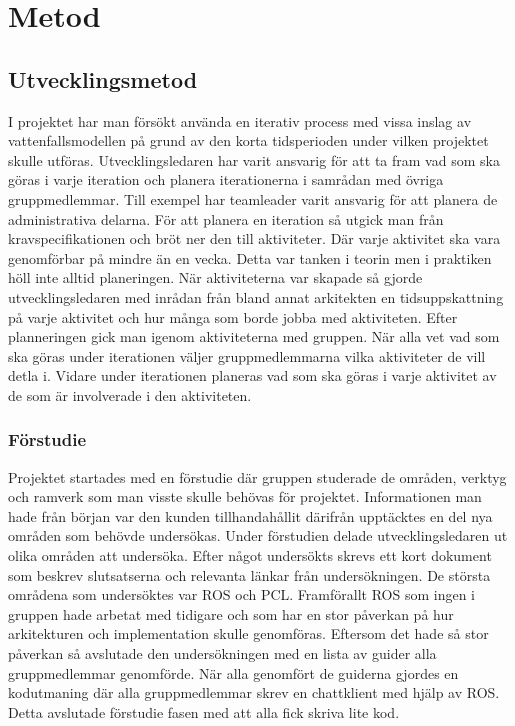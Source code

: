 \chapter{Metod}
\label{cha:method}

\section{Utvecklingsmetod}

I projektet har man försökt använda en iterativ process med vissa inslag av vattenfallsmodellen på grund av den korta tidsperioden under vilken projektet skulle utföras. Utvecklingsledaren har varit ansvarig för att ta fram vad som ska göras i varje iteration och planera iterationerna i samrådan med övriga gruppmedlemmar. Till exempel har teamleader varit ansvarig för att planera de administrativa delarna. För att planera en iteration så utgick man från kravspecifikationen och bröt ner den till aktiviteter. Där varje aktivitet ska vara genomförbar på mindre än en vecka. Detta var tanken i teorin men i praktiken höll inte alltid planeringen. När aktiviteterna var skapade så gjorde utvecklingsledaren med inrådan från bland annat arkitekten en tidsuppskattning på varje aktivitet och hur många som borde jobba med aktiviteten. Efter planneringen gick man igenom aktiviteterna med gruppen. När alla vet vad som ska göras under iterationen väljer gruppmedlemmarna vilka aktiviteter de vill detla i. Vidare under iterationen planeras vad som ska göras i varje aktivitet av de som är involverade i den aktiviteten.

\subsection{Förstudie}

Projektet startades med en förstudie där gruppen studerade de områden, verktyg och ramverk som man visste skulle behövas för projektet. Informationen man hade från början var den kunden tillhandahållit därifrån upptäcktes en del nya områden som behövde undersökas. Under förstudien delade utvecklingsledaren ut olika områden att undersöka. Efter något undersökts skrevs ett kort dokument som beskrev slutsatserna och relevanta länkar från undersökningen. De största områdena som undersöktes var ROS och PCL. Framförallt ROS som ingen i gruppen hade arbetat med tidigare och som har en stor påverkan på hur arkitekturen och implementation skulle genomföras. Eftersom det hade så stor påverkan så avslutade den undersökningen med en lista av guider alla gruppmedlemmar genomförde. När alla genomfört de guiderna gjordes en kodutmaning där alla gruppmedlemmar skrev en chattklient med hjälp av ROS. Detta avslutade förstudie fasen med att alla fick skriva lite kod. 

